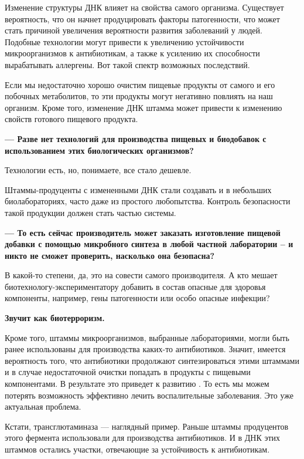 Изменение структуры ДНК влияет на свойства самого организма.
Существует вероятность, что он начнет продуцировать факторы патогенности,
что может стать причиной увеличения вероятности развития заболеваний у людей.
Подобные технологии могут привести к увеличению устойчивости микроорганизмов
к антибиотикам, а также к усилению их способности вырабатывать аллергены.
Вот такой спектр возможных последствий.

Если мы недостаточно хорошо очистим пищевые продукты от самого
и его побочных метаболитов, то эти продукты могут негативно повлиять
на наш организм.
Кроме того, изменение ДНК штамма может привести к изменению
свойств готового пищевого продукта.

\textbf{--- Разве нет технологий для производства пищевых и
    биодобавок с использованием этих биологических организмов?}

Технологии есть, но, понимаете, все стало дешевле.

\begin{fancyquotes}
    Штаммы-продуценты с измененными ДНК стали создавать и в небольших биолабораториях,
    часто даже из простого любопытства.
    Контроль безопасности такой продукции должен стать частью системы.
\end{fancyquotes}

\textbf{--- То есть сейчас производитель может заказать изготовление
    пищевой добавки с помощью микробного синтеза в любой частной лаборатории
    -- и никто не сможет проверить, насколько она безопасна? }

В какой-то степени, да, это на совести самого производителя.
А кто мешает биотехнологу-экспериментатору добавить в состав опасные
для здоровья компоненты, например, гены патогенности или особо опасные инфекции?

\textbf{Звучит как биотерроризм.}

Кроме того, штаммы микроорганизмов, выбранные лабораториями, могли быть ранее
использованы для производства каких-то антибиотиков.
Значит, имеется вероятность того, что антибиотики продолжают синтезироваться
этими штаммами и в случае недостаточной очистки попадать в продукты с пищевыми
компонентами.
В результате это приведет к развитию
.
То есть мы можем потерять возможность эффективно лечить
воспалительные заболевания. Это уже актуальная проблема.

Кстати, трансглютаминаза --- наглядный пример.
Раньше штаммы продуцентов этого фермента использовали для производства
антибиотиков. И в ДНК этих штаммов остались участки,
отвечающие за устойчивость к антибиотикам.

